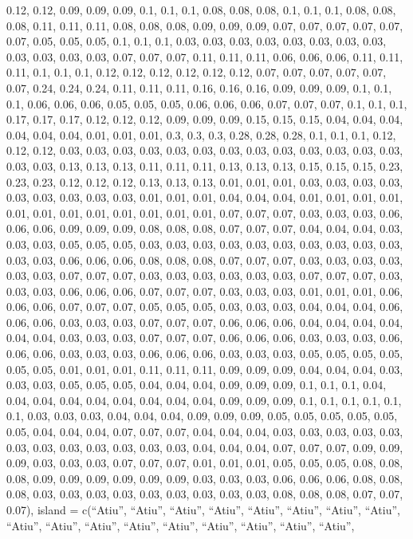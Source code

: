 \documentclass[
  ,man]{apa6}
\begin{document}
0.12, 0.12, 0.09, 0.09, 0.09, 0.1, 0.1, 0.1, 0.08, 0.08, 0.08, 0.1, 0.1, 0.1, 0.08, 0.08, 0.08, 0.11, 0.11, 0.11, 0.08, 0.08, 0.08, 0.09, 0.09, 0.09, 0.07, 0.07, 0.07, 0.07, 0.07, 0.07, 0.05, 0.05, 0.05, 0.1, 0.1, 0.1, 0.03, 0.03, 0.03, 0.03, 0.03, 0.03, 0.03, 0.03, 0.03, 0.03, 0.03, 0.03, 0.07, 0.07, 0.07, 0.11, 0.11, 0.11, 0.06, 0.06, 0.06, 0.11, 0.11, 0.11, 0.1, 0.1, 0.1, 0.12, 0.12, 0.12, 0.12, 0.12, 0.12, 0.07, 0.07, 0.07, 0.07, 0.07, 0.07, 0.24, 0.24, 0.24, 0.11, 0.11, 0.11, 0.16, 0.16, 0.16,
0.09, 0.09, 0.09, 0.1, 0.1, 0.1, 0.06, 0.06, 0.06, 0.05, 0.05, 0.05, 0.06, 0.06, 0.06, 0.07, 0.07, 0.07, 0.1, 0.1, 0.1, 0.17, 0.17, 0.17, 0.12, 0.12, 0.12, 0.09, 0.09, 0.09, 0.15, 0.15, 0.15, 0.04, 0.04, 0.04, 0.04, 0.04, 0.04, 0.01, 0.01, 0.01, 0.3, 0.3, 0.3, 0.28, 0.28, 0.28, 0.1, 0.1, 0.1, 0.12, 0.12, 0.12, 0.03, 0.03, 0.03, 0.03, 0.03, 0.03, 0.03, 0.03, 0.03, 0.03, 0.03, 0.03, 0.03, 0.03, 0.03, 0.13, 0.13, 0.13, 0.11, 0.11, 0.11, 0.13, 0.13, 0.13, 0.15, 0.15, 0.15, 0.23, 0.23, 0.23, 0.12, 0.12,
0.12, 0.13, 0.13, 0.13, 0.01, 0.01, 0.01, 0.03, 0.03, 0.03, 0.03, 0.03, 0.03, 0.03, 0.03, 0.03, 0.01, 0.01, 0.01, 0.04, 0.04, 0.04, 0.01, 0.01, 0.01, 0.01, 0.01, 0.01, 0.01, 0.01, 0.01, 0.01, 0.01, 0.01, 0.07, 0.07, 0.07, 0.03, 0.03, 0.03, 0.06, 0.06, 0.06, 0.09, 0.09, 0.09, 0.08, 0.08, 0.08, 0.07, 0.07, 0.07, 0.04, 0.04, 0.04, 0.03, 0.03, 0.03, 0.05, 0.05, 0.05, 0.03, 0.03, 0.03, 0.03, 0.03, 0.03, 0.03, 0.03, 0.03, 0.03, 0.03, 0.03, 0.06, 0.06, 0.06, 0.08, 0.08, 0.08, 0.07, 0.07, 0.07, 0.03, 0.03,
0.03, 0.03, 0.03, 0.03, 0.07, 0.07, 0.07, 0.03, 0.03, 0.03, 0.03, 0.03, 0.03, 0.07, 0.07, 0.07, 0.03, 0.03, 0.03, 0.06, 0.06, 0.06, 0.07, 0.07, 0.07, 0.03, 0.03, 0.03, 0.01, 0.01, 0.01, 0.06, 0.06, 0.06, 0.07, 0.07, 0.07, 0.05, 0.05, 0.05, 0.03, 0.03, 0.03, 0.04, 0.04, 0.04, 0.06, 0.06, 0.06, 0.03, 0.03, 0.03, 0.07, 0.07, 0.07, 0.06, 0.06, 0.06, 0.04, 0.04, 0.04, 0.04, 0.04, 0.04, 0.03, 0.03, 0.03, 0.07, 0.07, 0.07, 0.06, 0.06, 0.06, 0.03, 0.03, 0.03, 0.06, 0.06, 0.06, 0.03, 0.03, 0.03, 0.06, 0.06,
0.06, 0.03, 0.03, 0.03, 0.05, 0.05, 0.05, 0.05, 0.05, 0.05, 0.01, 0.01, 0.01, 0.11, 0.11, 0.11, 0.09, 0.09, 0.09, 0.04, 0.04, 0.04, 0.03, 0.03, 0.03, 0.05, 0.05, 0.05, 0.04, 0.04, 0.04, 0.09, 0.09, 0.09, 0.1, 0.1, 0.1, 0.04, 0.04, 0.04, 0.04, 0.04, 0.04, 0.04, 0.04, 0.04, 0.09, 0.09, 0.09, 0.1, 0.1, 0.1, 0.1, 0.1, 0.1, 0.03, 0.03, 0.03, 0.04, 0.04, 0.04, 0.09, 0.09, 0.09, 0.05, 0.05, 0.05, 0.05, 0.05, 0.05, 0.04, 0.04, 0.04, 0.07, 0.07, 0.07, 0.04, 0.04, 0.04, 0.03, 0.03, 0.03, 0.03, 0.03, 0.03,
0.03, 0.03, 0.03, 0.03, 0.03, 0.03, 0.04, 0.04, 0.04, 0.07, 0.07, 0.07, 0.09, 0.09, 0.09, 0.03, 0.03, 0.03, 0.07, 0.07, 0.07, 0.01, 0.01, 0.01, 0.05, 0.05, 0.05, 0.08, 0.08, 0.08, 0.09, 0.09, 0.09, 0.09, 0.09, 0.09, 0.03, 0.03, 0.03, 0.06, 0.06, 0.06, 0.08, 0.08, 0.08, 0.03, 0.03, 0.03, 0.03, 0.03, 0.03, 0.03, 0.03, 0.03, 0.08, 0.08, 0.08, 0.07, 0.07, 0.07), island = c(``Atiu'', ``Atiu'', ``Atiu'', ``Atiu'', ``Atiu'', ``Atiu'', ``Atiu'', ``Atiu'', ``Atiu'', ``Atiu'', ``Atiu'', ``Atiu'', ``Atiu'', ``Atiu'', ``Atiu'', ``Atiu'', ``Atiu'',
\end{document}

